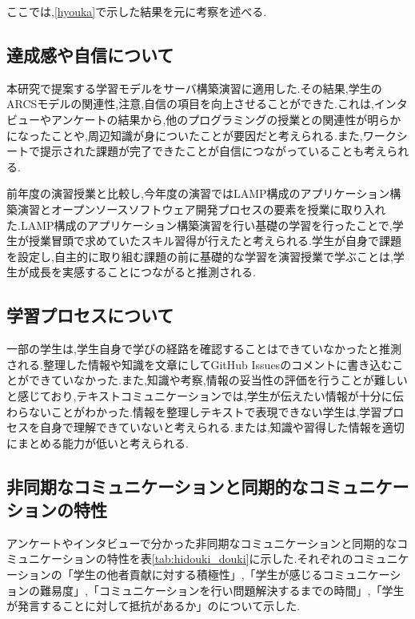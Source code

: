 \documentclass[11pt, a4paper]{jreport}
\begin{document}
ここでは,\ref{hyouka}で示した結果を元に考察を述べる.

\subsection{達成感や自信について}

本研究で提案する学習モデルをサーバ構築演習に適用した.その結果,学生のARCSモデルの関連性,注意,自信の項目を向上させることができた.これは,インタビューやアンケートの結果から,他のプログラミングの授業との関連性が明らかになったことや,周辺知識が身についたことが要因だと考えられる.また,ワークシートで提示された課題が完了できたことが自信につながっていることも考えられる.

前年度の演習授業と比較し,今年度の演習ではLAMP構成のアプリケーション構築演習とオープンソースソフトウェア開発プロセスの要素を授業に取り入れた.LAMP構成のアプリケーション構築演習を行い基礎の学習を行ったことで,学生が授業冒頭で求めていたスキル習得が行えたと考えられる.学生が自身で課題を設定し,自主的に取り組む課題の前に基礎的な学習を演習授業で学ぶことは,学生が成長を実感することにつながると推測される.

\subsection{学習プロセスについて}

一部の学生は,学生自身で学びの経路を確認することはできていなかったと推測される.整理した情報や知識を文章にしてGitHub Issuesのコメントに書き込むことができていなかった.また,知識や考察,情報の妥当性の評価を行うことが難しいと感じており,テキストコミュニケーションでは,学生が伝えたい情報が十分に伝わらないことがわかった.情報を整理しテキストで表現できない学生は,学習プロセスを自身で理解できていないと考えられる.または,知識や習得した情報を適切にまとめる能力が低いと考えられる.

\subsection{非同期なコミュニケーションと同期的なコミュニケーションの特性}

アンケートやインタビューで分かった非同期なコミュニケーションと同期的なコミュニケーションの特性を表\ref{tab:hidouki_douki}に示した.それぞれのコミュニケーションの「学生の他者貢献に対する積極性」,「学生が感じるコミュニケーションの難易度」,「コミュニケーションを行い問題解決するまでの時間」,「学生が発言することに対して抵抗があるか」のについて示した.
\end{document}
